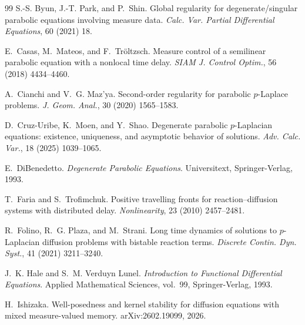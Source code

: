 \documentclass[a4paper,11pt,oneside,reqno]{amsart}
\newcounter{c}
\newcounter{d}
\newcounter{b}
\begin{document}
\begin{thebibliography}{99}
S.-S. Byun, J.-T. Park, and P.~Shin.
\newblock Global regularity for degenerate/singular parabolic equations
involving measure data.
\newblock \emph{Calc. Var. Partial Differential Equations},
60 (2021) 18.


E.~Casas, M.~Mateos, and F.~Tr{\"o}ltzsch.
\newblock Measure control of a semilinear parabolic equation with
a nonlocal time delay.
\newblock \emph{SIAM J. Control Optim.},
56 (2018) 4434--4460.


A.~Cianchi and V.~G. Maz'ya.
\newblock Second-order regularity for parabolic \(p\)-Laplace problems.
\newblock \emph{J. Geom. Anal.},
30 (2020) 1565--1583.


D.~Cruz-Uribe, K.~Moen, and Y.~Shao.
\newblock Degenerate parabolic \(p\)-Laplacian equations:
existence, uniqueness, and asymptotic behavior of solutions.
\newblock \emph{Adv. Calc. Var.},
18 (2025) 1039--1065.


E.~DiBenedetto.
\newblock \emph{Degenerate Parabolic Equations}.
\newblock Universitext, Springer-Verlag, 1993.


T.~Faria and S.~Trofimchuk.
\newblock Positive travelling fronts for reaction--diffusion systems
with distributed delay.
\newblock \emph{Nonlinearity},
23 (2010) 2457--2481.


R.~Folino, R.~G. Plaza, and M.~Strani.
\newblock Long time dynamics of solutions to \(p\)-Laplacian diffusion
problems with bistable reaction terms.
\newblock \emph{Discrete Contin. Dyn. Syst.},
41 (2021) 3211--3240.


J.~K. Hale and S.~M. Verduyn Lunel.
\newblock \emph{Introduction to Functional Differential Equations}.
\newblock Applied Mathematical Sciences, vol.~99,
Springer-Verlag, 1993.


H.~Ishizaka.
\newblock Well-posedness and kernel stability for diffusion equations
with mixed measure-valued memory.
\newblock arXiv:2602.19099, 2026.



\end{thebibliography}
\end{document}
